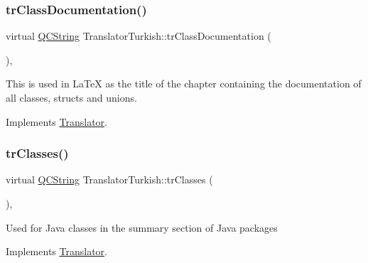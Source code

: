 \mbox{\label{class_translator_turkish_a2e742a57b8264681b0751373da4f9d52}} 
\subsubsection{\texorpdfstring{trClassDocumentation()}{trClassDocumentation()}}
{\footnotesize\ttfamily virtual \mbox{\hyperlink{class_q_c_string}{Q\+C\+String}} Translator\+Turkish\+::tr\+Class\+Documentation (\begin{DoxyParamCaption}{ }\end{DoxyParamCaption})\hspace{0.3cm}{\ttfamily [inline]}, {\ttfamily [virtual]}}

This is used in La\+TeX as the title of the chapter containing the documentation of all classes, structs and unions. 

Implements \mbox{\hyperlink{class_translator}{Translator}}.

\mbox{\label{class_translator_turkish_af702be6335793ee754ad27e7030154b3}} 
\subsubsection{\texorpdfstring{trClasses()}{trClasses()}}
{\footnotesize\ttfamily virtual \mbox{\hyperlink{class_q_c_string}{Q\+C\+String}} Translator\+Turkish\+::tr\+Classes (\begin{DoxyParamCaption}{ }\end{DoxyParamCaption})\hspace{0.3cm}{\ttfamily [inline]}, {\ttfamily [virtual]}}

Used for Java classes in the summary section of Java packages 

Implements \mbox{\hyperlink{class_translator}{Translator}}.

\mbox{\label{class_translator_turkish_a6529e9870994c91e4adcb6161e69eb80}} 
